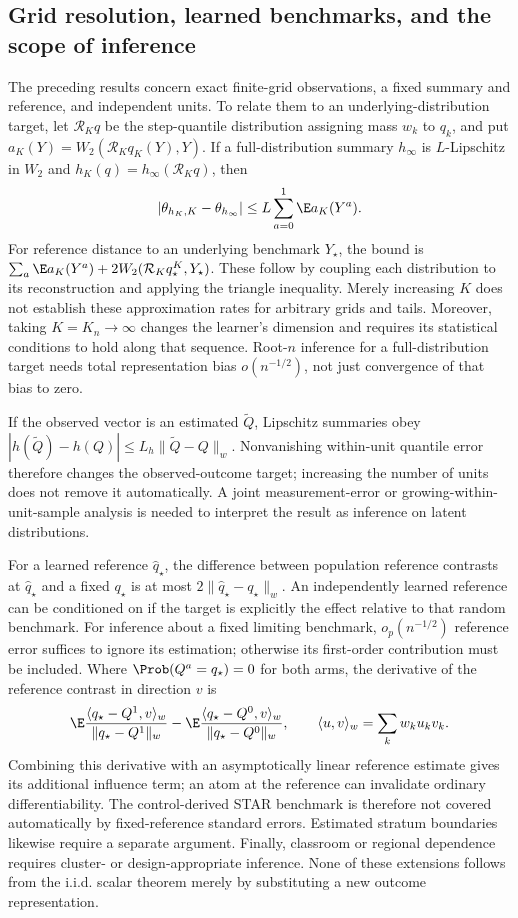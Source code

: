 \subsection{Grid resolution, learned benchmarks, and the scope of inference}

The preceding results concern exact finite-grid observations, a fixed summary and reference, and independent units. To relate them to an underlying-distribution target, let $\mathcal R_Kq$ be the step-quantile distribution assigning mass $w_k$ to $q_k$, and put $a_K(Y)=W_2(\mathcal R_Kq_K(Y),Y)$. If a full-distribution summary $h_\infty$ is $L$-Lipschitz in $W_2$ and $h_K(q)=h_\infty(\mathcal R_Kq)$, then
\[
 |\theta_{h_K,K}-\theta_{h_\infty}|\leq L\sum_{a=0}^1\E a_K(Y^a).
\]
For reference distance to an underlying benchmark $Y_\star$, the bound is $\sum_a\E a_K(Y^a)+2W_2(\mathcal R_Kq_\star^K,Y_\star)$. These follow by coupling each distribution to its reconstruction and applying the triangle inequality. Merely increasing $K$ does not establish these approximation rates for arbitrary grids and tails. Moreover, taking $K=K_n\to\infty$ changes the learner's dimension and requires its statistical conditions to hold along that sequence. Root-$n$ inference for a full-distribution target needs total representation bias $o(n^{-1/2})$, not just convergence of that bias to zero.

If the observed vector is an estimated $\widetilde Q$, Lipschitz summaries obey $|h(\widetilde Q)-h(Q)|\leq L_h\|\widetilde Q-Q\|_w$. Nonvanishing within-unit quantile error therefore changes the observed-outcome target; increasing the number of units does not remove it automatically. A joint measurement-error or growing-within-unit-sample analysis is needed to interpret the result as inference on latent distributions.

For a learned reference $\widehat q_\star$, the difference between population reference contrasts at $\widehat q_\star$ and a fixed $q_\star$ is at most $2\|\widehat q_\star-q_\star\|_w$. An independently learned reference can be conditioned on if the target is explicitly the effect relative to that random benchmark. For inference about a fixed limiting benchmark, $o_p(n^{-1/2})$ reference error suffices to ignore its estimation; otherwise its first-order contribution must be included. Where $\Prob(Q^a=q_\star)=0$ for both arms, the derivative of the reference contrast in direction $v$ is
\[
 \E\frac{\langle q_\star-Q^1,v\rangle_w}{\|q_\star-Q^1\|_w}
 -\E\frac{\langle q_\star-Q^0,v\rangle_w}{\|q_\star-Q^0\|_w},\qquad
 \langle u,v\rangle_w=\sum_k w_ku_kv_k.
\]
Combining this derivative with an asymptotically linear reference estimate gives its additional influence term; an atom at the reference can invalidate ordinary differentiability. The control-derived STAR benchmark is therefore not covered automatically by fixed-reference standard errors. Estimated stratum boundaries likewise require a separate argument. Finally, classroom or regional dependence requires cluster- or design-appropriate inference. None of these extensions follows from the i.i.d. scalar theorem merely by substituting a new outcome representation.

